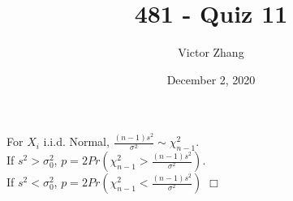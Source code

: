 \documentclass{article}
\title{481 - Quiz 11}
\author{Victor Zhang}
\date{December 2, 2020}
\begin{document}
\maketitle

\section{}
For $X_i$ i.i.d. Normal, $\frac{(n-1)s^2}{\sigma^2} \sim \chi^2_{n-1}$.\\
If $s^2 > \sigma_0^2$, $p = 2Pr(\chi^2_{n-1} > \frac{(n-1)s^2}{\sigma^2})$.\\
If $s^2 < \sigma_0^2$, $p = 2Pr(\chi^2_{n-1} < \frac{(n-1)s^2}{\sigma^2})$ $\Box$
\end{document}
